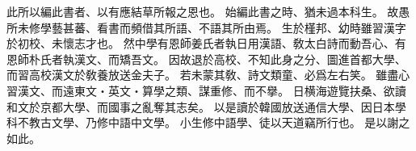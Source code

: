 此所以編此書者、以有應結草所報之恩也。
始編此書之時、猶未過本科生。
故愚所未修學藝甚蕃、看書而頻借其所語、不語其所由焉。
生於槿邦、幼時雖習漢字於初校、未懷志才也。
然中學有恩師姜氏者執日用漢語、敎太白詩而動吾心、有恩師朴氏者執漢文、而矯吾文。
因故退於高校、不知此身之分、圖進首都大學、而習高校漢文於敎養放送金夫子。
若未蒙其敎、詩文類童、必爲左右笑。
雖盡心習漢文、而遠東文・英文・算學之類、謀重修、而不擧。
日横海遊覽扶桑、欲讀和文於京都大學、而國事之亂奪其志矣。
以是讀於韓國放送通信大學、因日本學科不教古文學、乃修中語中文學。
小生修中語學、徒以天道竊所行也。
是以謝之如此。

